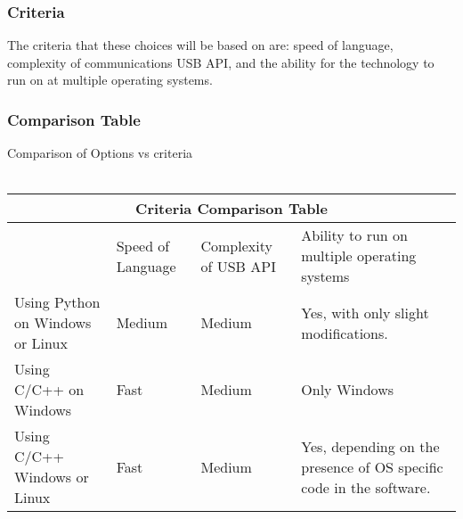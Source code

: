 \documentclass[10pt,draftclsnofoot,onecolumn]{IEEEtran}
\begin{document}
\subsubsection{Criteria}
      The criteria that these choices will be based on are: speed of language, complexity of communications USB API, and the ability for the technology to run on at multiple operating systems.\\
\subsubsection{Comparison Table}
Comparison of Options vs criteria \\ \\
\begin{tabular}{ |p{2cm}|p{2cm}|p{2cm}| p{2cm}| }
\hline
\multicolumn{4}{|c|}{Criteria Comparison Table} \\
\hline
   &Speed of Language&Complexity of USB API&Ability to run on multiple operating systems\\
\hline
Using Python on Windows or Linux&Medium&Medium&Yes, with only slight modifications. \\
\hline
Using C/C++ on Windows&Fast&Medium&Only Windows \\
\hline
Using C/C++ Windows or Linux &Fast&Medium&Yes, depending on the presence of OS specific code in the software. \\
\hline
\end{tabular}
\vspace{1cm}
\end{document}
